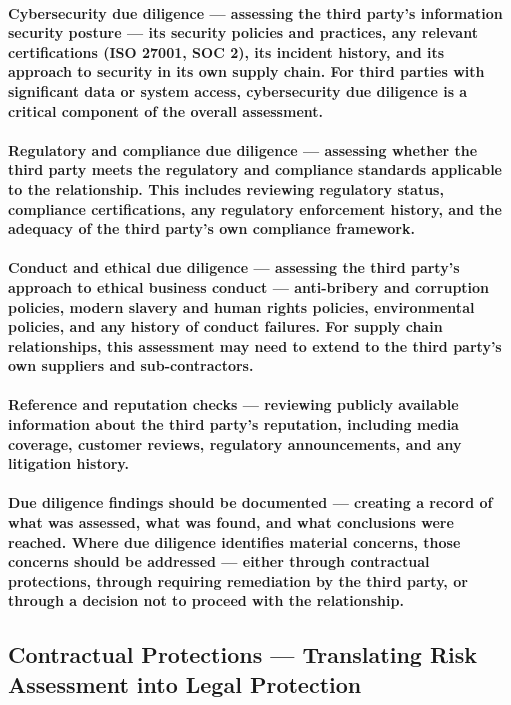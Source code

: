 \paragraph{\textbf{Cybersecurity due diligence} — assessing the third party's information security posture — its security policies and practices, any relevant certifications (ISO 27001, SOC 2), its incident history, and its approach to security in its own supply chain. For third parties with significant data or system access, cybersecurity due diligence is a critical component of the overall assessment.}
\paragraph{\textbf{Regulatory and compliance due diligence} — assessing whether the third party meets the regulatory and compliance standards applicable to the relationship. This includes reviewing regulatory status, compliance certifications, any regulatory enforcement history, and the adequacy of the third party's own compliance framework.}
\paragraph{\textbf{Conduct and ethical due diligence} — assessing the third party's approach to ethical business conduct — anti-bribery and corruption policies, modern slavery and human rights policies, environmental policies, and any history of conduct failures. For supply chain relationships, this assessment may need to extend to the third party's own suppliers and sub-contractors.}
\paragraph{\textbf{Reference and reputation checks} — reviewing publicly available information about the third party's reputation, including media coverage, customer reviews, regulatory announcements, and any litigation history.}
\paragraph{Due diligence findings should be documented — creating a record of what was assessed, what was found, and what conclusions were reached. Where due diligence identifies material concerns, those concerns should be addressed — either through contractual protections, through requiring remediation by the third party, or through a decision not to proceed with the relationship.}

\subsection{Contractual Protections — Translating Risk Assessment into Legal Protection}
